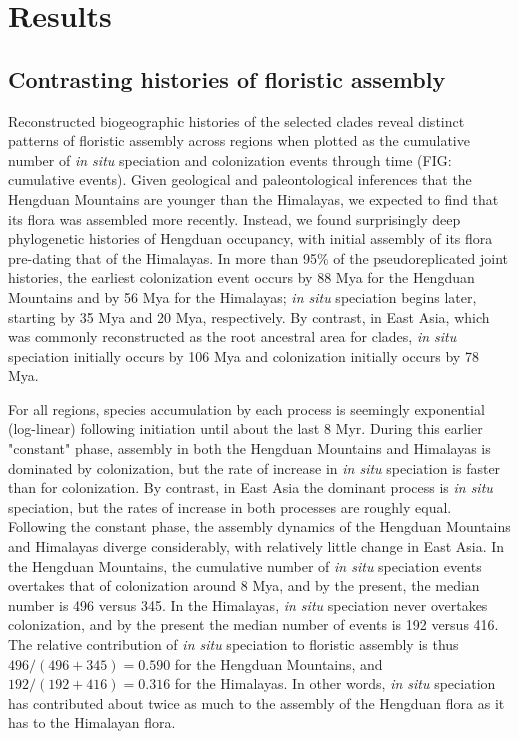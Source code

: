 \section{Results}

\subsection{Contrasting histories of floristic assembly}

Reconstructed biogeographic histories of the selected clades reveal distinct patterns of floristic assembly across regions when plotted as the cumulative number of \textit{in situ} speciation and colonization events through time (FIG: cumulative events). Given geological and paleontological inferences that the Hengduan Mountains are younger than the Himalayas, we expected to find that its flora was assembled more recently. Instead, we found surprisingly deep phylogenetic histories of Hengduan occupancy, with initial assembly of its flora pre-dating that of the Himalayas. In more than 95\% of the pseudoreplicated joint histories, the earliest colonization event occurs by 88 Mya for the Hengduan Mountains and by 56 Mya for the Himalayas; \textit{in situ} speciation begins later, starting by 35 Mya and 20 Mya, respectively. By contrast, in East Asia, which was commonly reconstructed as the root ancestral area for clades, \textit{in situ} speciation initially occurs by 106 Mya and colonization initially occurs by 78 Mya.

For all regions, species accumulation by each process is seemingly exponential (log-linear) following initiation until about the last 8 Myr. During this earlier "constant" phase, assembly in both the Hengduan Mountains and Himalayas is dominated by colonization, but the rate of increase in \textit{in situ} speciation is faster than for colonization. By contrast, in East Asia the dominant process is \textit{in situ} speciation, but the rates of increase in both processes are roughly equal. Following the constant phase, the assembly dynamics of the Hengduan Mountains and Himalayas diverge considerably, with relatively little change in East Asia. In the Hengduan Mountains, the cumulative number of \textit{in situ} speciation events overtakes that of colonization around 8 Mya, and by the present, the median number is 496 versus 345. In the Himalayas, \textit{in situ} speciation never overtakes colonization, and by the present the median number of events is 192 versus 416. The relative contribution of \textit{in situ} speciation to floristic assembly is thus $496/(496+345) = 0.590$ for the Hengduan Mountains, and $192/(192+416) = 0.316$ for the Himalayas. In other words, \textit{in situ} speciation has contributed about twice as much to the assembly of the Hengduan flora as it has to the Himalayan flora.

